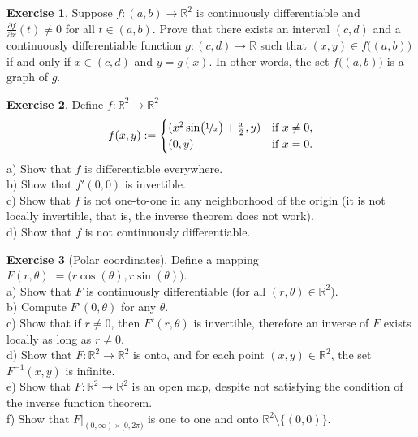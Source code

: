 \documentclass[12pt]{book}
\newcommand{\R}{{\mathbb{R}}}
\theoremstyle{plain}
\theoremstyle{remark}
\theoremstyle{definition}
\theoremstyle{exercise}
\newtheorem{exercise}{Exercise}[section]
\theoremstyle{example}
\begin{document}
\begin{exercise}
Suppose $f \colon (a,b) \to \R^2$ is continuously differentiable and
$\frac{\partial f}{\partial x}(t) \not= 0$ for all $t \in (a,b)$.
Prove that there exists an interval $(c,d)$ and
a continuously differentiable function $g \colon (c,d) \to \R$
such that 
$(x,y) \in f\bigl((a,b)\bigr)$ if and only if $x \in (c,d)$ and $y=g(x)$.
In other words, the set
$f\bigl((a,b)\bigr)$ is a graph of $g$.
\end{exercise}

\begin{exercise}
Define $f \colon \R^2 \to \R^2$
\begin{equation*}
f(x,y) :=
\begin{cases}
(x^2 \sin \bigl(\nicefrac{1}{x}\bigr) + \frac{x}{2} , y ) & \text{if $x \not= 0$,} \\
(0,y) & \text{if $x=0$.}
\end{cases}
\end{equation*}
a) Show that $f$ is differentiable everywhere.\\
b) Show that $f'(0,0)$ is invertible.\\
c) Show that $f$ is not one-to-one in any neighborhood of the origin (it is
not locally invertible, that is, the inverse theorem does not work).\\
d) Show that $f$ is not continuously differentiable.
\end{exercise}

\begin{exercise}[Polar coordinates] \label{mv:exercise:polarcoordinates}
Define a mapping $F(r,\theta) := \bigl(r \cos(\theta), r \sin(\theta) \bigr)$.
\\
a) Show that $F$ is continuously differentiable (for all $(r,\theta) \in
\R^2$).\\
b) Compute $F'(0,\theta)$ for any $\theta$.\\
c) Show that if $r \not= 0$, then $F'(r,\theta)$ is invertible, therefore an
inverse of $F$ exists locally as long as $r \not= 0$.\\
d) Show that $F \colon \R^2 \to \R^2$ is onto, and for each point $(x,y) \in
\R^2$, the set $F^{-1}(x,y)$ is infinite.\\
e) Show that $F \colon \R^2 \to \R^2$ is an open map, despite not satisfying the condition of the
inverse function theorem.\\
f) Show that $F|_{(0,\infty) \times [0,2\pi)}$ is one to one and onto
$\R^2 \setminus \{ (0,0) \}$.
\end{exercise}
\end{document}
